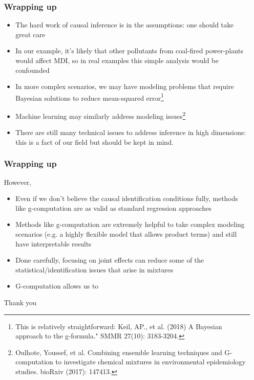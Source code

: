 \begin{frame}[t, fragile]
  \frametitle{Wrapping up}
    \begin{itemize}
      \item The hard work of causal inference is in the assumptions: one should take great care
      \item In our example, it's likely that other pollutants from coal-fired power-plants would affect MDI, so in real examples this simple analysis would be confounded
      \item In more complex scenarios, we may have modeling problems that require Bayesian solutions to reduce mean-squared error\footnote{This is relatively straightforward: Keil, AP., et al. (2018) A Bayesian approach to the g-formula." SMMR 27(10): 3183-3204.}
      \item Machine learning may similarly address modeling issues\footnote{Oulhote, Youssef, et al. Combining ensemble learning techniques and G-computation to investigate chemical mixtures in environmental epidemiology studies. bioRxiv (2017): 147413.}
      \item There are still many technical issues to address inference in high dimensions: this is a fact of our field but should be kept in mind.
    \end{itemize}

 \end{frame}

\begin{frame}[t, fragile]
  \frametitle{Wrapping up}
  However,
    \begin{itemize}
      \item Even if we don't believe the causal identification conditions fully, methods like g-computation are as valid as standard regression approaches
      \item Methods like g-computation are extremely helpful to take complex modeling scenarios (e.g. a highly flexible model that allows product terms) and still have interpretable results
      \item Done carefully, focusing on joint effects can reduce some of the statistical/identification issues that arise in mixtures
      \item G-computation allows us to 
    \end{itemize}

 \end{frame}


\begin{frame}[c, fragile]
\centering
Thank you
 \end{frame}


